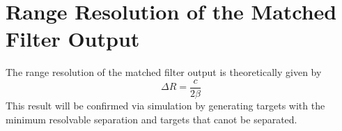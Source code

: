 \documentclass[12pt,letterpaper]{article}
\begin{document}
\section{Range Resolution of the Matched Filter Output}
The range resolution of the matched filter output is theoretically given by
\begin{equation}
\Delta R = \frac{c}{2\beta}
\end{equation}
This result will be confirmed via simulation by generating targets with the minimum resolvable separation and targets that canot be separated.
\end{document}
